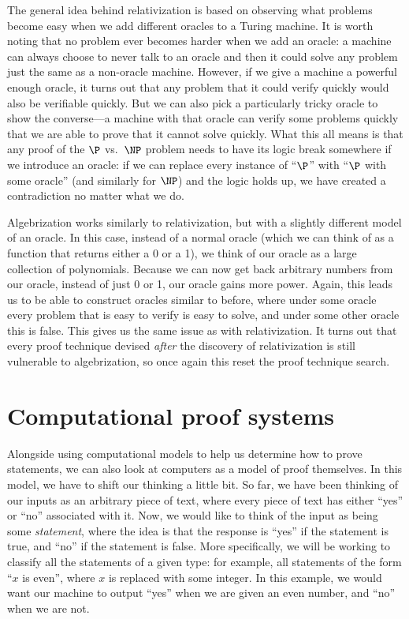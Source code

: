 \documentclass[english,12pt]{reedthesis}
\theoremstyle{plain}
\theoremstyle{definition}
\theoremstyle{remark}
\begin{document}
The general idea behind relativization is based on observing what problems
become easy when we add different oracles to a Turing machine. It is worth
noting that no problem ever becomes harder when we add an oracle: a machine can
always choose to never talk to an oracle and then it could solve any problem
just the same as a non-oracle machine. However, if we give a machine a powerful
enough oracle, it turns out that any problem that it could verify quickly would
also be verifiable quickly. But we can also pick a particularly tricky oracle to
show the converse---a machine with that oracle can verify some problems quickly
that we are able to prove that it cannot solve quickly. What this all means is
that any proof of the $\P$ vs.\ $\NP$ problem needs to have its logic break
somewhere if we introduce an oracle: if we can replace every instance of
``$\P$'' with ``$\P$ with some oracle'' (and similarly for $\NP$) and the logic
holds up, we have created a contradiction no matter what we do.

Algebrization works similarly to relativization, but with a slightly different
model of an oracle. In this case, instead of a normal oracle (which we can think
of as a function that returns either a 0 or a 1), we think of our oracle as a
large collection of polynomials. Because we can now get back arbitrary numbers
from our oracle, instead of just 0 or 1, our oracle gains more power. Again,
this leads us to be able to construct oracles similar to before, where under
some oracle every problem that is easy to verify is easy to solve, and under
some other oracle this is false. This gives us the same issue as with
relativization. It turns out that every proof technique devised \emph{after} the
discovery of relativization is still vulnerable to algebrization, so once again
this reset the proof technique search.

\section{Computational proof systems}

Alongside using computational models to help us determine how to prove
statements, we can also look at computers as a model of proof themselves. In
this model, we have to shift our thinking a little bit. So far, we have been
thinking of our inputs as an arbitrary piece of text, where every piece of text
has either ``yes'' or ``no'' associated with it. Now, we would like to think of
the input as being some \emph{statement}, where the idea is that the response is
``yes'' if the statement is true, and ``no'' if the statement is false. More
specifically, we will be working to classify all the statements of a given type:
for example, all statements of the form ``$x$ is even'', where $x$ is replaced
with some integer. In this example, we would want our machine to output ``yes''
when we are given an even number, and ``no'' when we are not.
\end{document}
